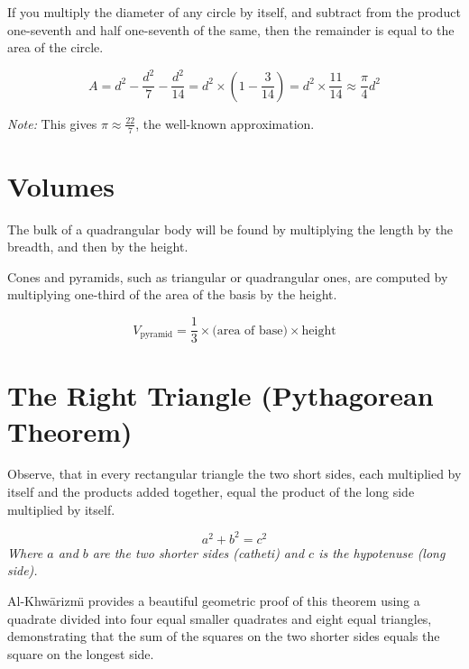 \documentclass[11pt,a4paper,openany,oneside]{book}
\newcommand{\cnote}[1]{\textcolor{notecolor}{\textit{#1}}}
\begin{document}
If you multiply the diameter of any circle by itself, and subtract from the
product one-seventh and half one-seventh of the same, then the remainder is
equal to the area of the circle.

\begin{equation}
A = d^2 - \frac{d^2}{7} - \frac{d^2}{14} = d^2 \times \left(1 - \frac{3}{14}\right) = d^2 \times \frac{11}{14} \approx \frac{\pi}{4} d^2
\end{equation}

\cnote{Note:} This gives $\pi \approx \frac{22}{7}$, the well-known approximation.

\section*{Volumes}

The bulk of a quadrangular body will be found by multiplying the length by
the breadth, and then by the height.

Cones and pyramids, such as triangular or quadrangular ones, are computed by
multiplying one-third of the area of the basis by the height.

\begin{equation}
V_{\text{pyramid}} = \frac{1}{3} \times \text{(area of base)} \times \text{height}
\end{equation}

\section*{The Right Triangle (Pythagorean Theorem)}

Observe, that in every rectangular triangle the two short sides, each
multiplied by itself and the products added together, equal the product of
the long side multiplied by itself.

\begin{mathbox}[title={\textbf{The Pythagorean Theorem}}]
\begin{equation}
a^2 + b^2 = c^2
\end{equation}
\textit{Where $a$ and $b$ are the two shorter sides (catheti) and $c$ is the
hypotenuse (long side).}
\end{mathbox}

Al-Khw\=arizm\"{\i} provides a beautiful geometric proof of this theorem using
a quadrate divided into four equal smaller quadrates and eight equal
triangles, demonstrating that the sum of the squares on the two shorter sides
equals the square on the longest side.
\end{document}

